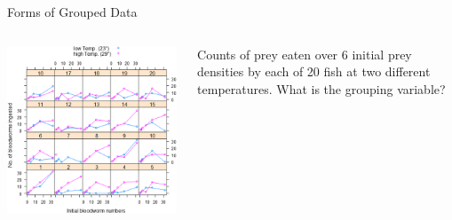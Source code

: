 \documentclass{beamer}
\begin{document}
\begin{frame}{Forms of Grouped Data}
  \begin{columns}[onlytextwidth] 
  \begin{column}{0.5\textwidth}
      \begin{center}
    \includegraphics[width=0.99\textwidth]{lectures/day_1_intro_to_mems/figures/bloodworms.png} %
  \end{center}
      \end{column}
    \hspace{0.02\textwidth} %
    \begin{column}{0.5\textwidth}
        Counts of prey eaten over 6 initial prey densities by each of 20 fish at two different temperatures. What is the grouping variable?  
    \end{column}
\end{columns}  \end{frame}
\end{document}
